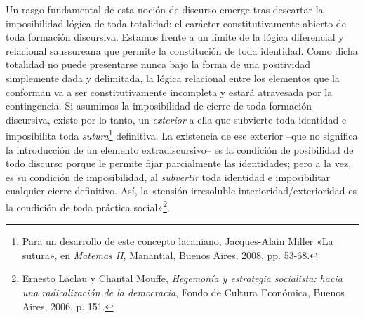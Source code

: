 Un rasgo fundamental de esta noción de discurso emerge tras descartar la imposibilidad lógica de toda totalidad: el carácter constitutivamente abierto de toda formación discursiva. Estamos frente a un límite de la lógica diferencial y relacional saussureana que permite la constitución de toda identidad. Como dicha totalidad no puede presentarse nunca bajo la forma de una positividad simplemente dada y delimitada, la lógica relacional entre los elementos que la conforman va a ser constitutivamente incompleta y estará atravesada por la contingencia. Si asumimos la imposibilidad de cierre de toda formación discursiva, existe por lo tanto, un \emph{exterior} a ella que subvierte toda identidad e imposibilita toda \emph{sutura}\footnote{Para un desarrollo de este concepto lacaniano, Jacques-Alain Miller «La sutura», en \emph{Matemas II}, Manantial, Buenos Aires, 2008, pp. 53-68.} definitiva. La existencia de ese exterior --que no significa la introducción de un elemento extradiscursivo-- es la condición de posibilidad de todo discurso porque le permite fijar parcialmente las identidades; pero a la vez, es su condición de imposibilidad, al \emph{subvertir} toda identidad e imposibilitar cualquier cierre definitivo. Así, la «tensión irresoluble interioridad/exterioridad es la condición de toda práctica social»\footnote{Ernesto Laclau y Chantal Mouffe, \emph{Hegemonía y estrategia socialista: hacia una radicalización de la democracia}, Fondo de Cultura Económica, Buenos Aires, 2006, p. 151.}.

